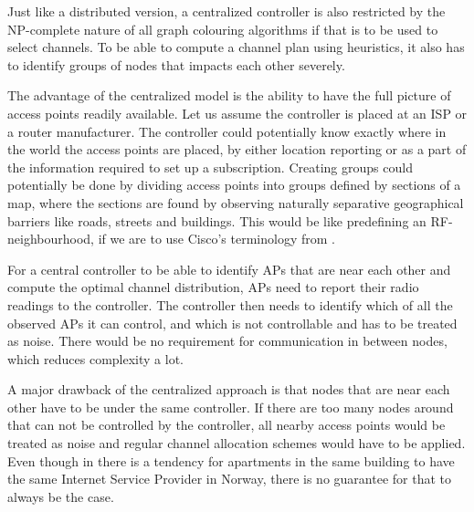 Just like a distributed version, a centralized controller is also restricted by the NP-complete nature of all graph colouring algorithms if that is to be used to select channels. 
To be able to compute a channel plan using heuristics, it also has to identify groups of nodes that impacts each other severely. 

The advantage of the centralized model is the ability to have the full picture of access points readily available. Let us assume the controller is placed at an ISP or a router manufacturer.
The controller could potentially know exactly where in the world the access points are placed, by either location reporting or as a part of the information required
to set up a subscription. Creating groups could potentially be done by dividing access points into groups defined by sections of a map, 
where the sections are found by observing naturally separative geographical barriers like roads, streets and buildings. This would be like predefining an RF-neighbourhood, 
if we are to use Cisco's terminology from \cite{ciscoRRM}. 

For a central controller to be able to identify APs that are near each other and compute the optimal channel distribution, APs need to report their radio readings to the controller. 
The controller then needs to identify which of all the observed APs it can control, and which is not controllable and has to be treated as noise. There would be no requirement for
communication in between nodes, which reduces complexity a lot.  

A major drawback of the centralized approach is that nodes that are near each other have to be under the same controller. If there are too many nodes around
that can not be controlled by the controller, all nearby access points would be treated as noise and regular channel allocation schemes would have to be applied.
Even though in there is a tendency for apartments in the same building to have the same Internet Service Provider in Norway, there is no guarantee for that to always be the case.  

